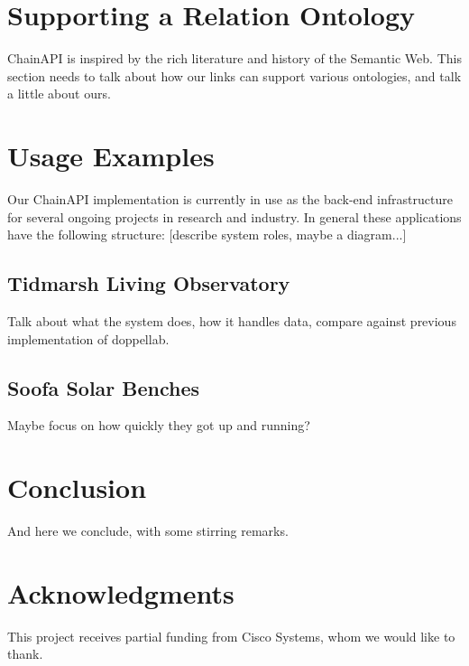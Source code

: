 \documentclass{acm_proc_article-sp}
\begin{document}
\section{Supporting a Relation Ontology}

ChainAPI is inspired by the rich literature and history of the Semantic Web.
This section needs to talk about how our links can support various ontologies,
and talk a little about ours.

\section{Usage Examples}

Our ChainAPI implementation is currently in use as the back-end infrastructure
for several ongoing projects in research and industry. In general these applications
have the following structure: [describe system roles, maybe a diagram...]


\subsection{Tidmarsh Living Observatory}

Talk about what the system does, how it handles data, compare against previous
implementation of doppellab.

\subsection{Soofa Solar Benches}

Maybe focus on how quickly they got up and running?

\section{Conclusion}
And here we conclude, with some stirring remarks.

\section{Acknowledgments}
This project receives partial funding from Cisco Systems, whom we would like to
thank.


%
%
\end{document}
